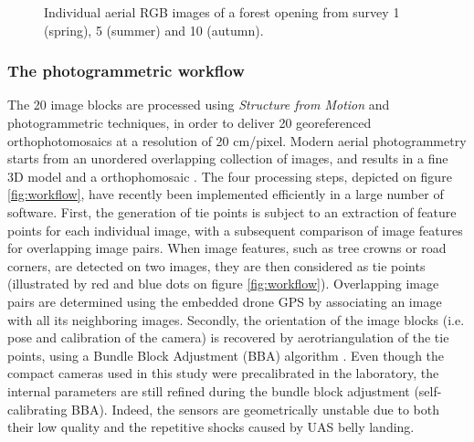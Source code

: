 \documentclass[remotesensing,article,submit,moreauthors,pdftex,12pt,a4paper]{mdpi} %
\begin{document}
\begin{figure}
\captionsetup[subfigure]{labelformat=empty}
\centering
{}\hspace{0.01mm}
\hspace{0.01mm}
\hspace{0.01mm}
\caption{Individual aerial RGB images of a forest opening from survey 1 (spring), 5 (summer) and 10 (autumn).}
\label{fig:TS_RawIm}
\end{figure}

\subsubsection{The photogrammetric workflow}

The 20 image blocks are processed using \textit{Structure from Motion} and photogrammetric techniques, in order to deliver 20 georeferenced orthophotomosaics at a resolution of 20 cm/pixel. 
Modern aerial photogrammetry starts from an unordered overlapping collection of images, and results in a fine 3D model and a orthophomosaic \citep{dandois_high_2013}. 
The four processing steps, depicted on figure \ref{fig:workflow}, have recently been implemented efficiently in a large number of software. 
First, the generation of tie points is subject to an extraction of feature points for each individual image, with a subsequent comparison of image features for overlapping image pairs. 
When image features, such as tree crowns or road corners, are detected on two images, they are then considered as tie points (illustrated by red and blue dots on figure \ref{fig:workflow}). 
Overlapping image pairs are determined using the embedded drone GPS by associating an image with all its neighboring images. 
Secondly, the orientation of the image blocks (i.e. pose and calibration of the camera) is recovered by aerotriangulation of the tie points, using a Bundle Block Adjustment (BBA) algorithm \cite{triggs_bundle_2000}. 
Even though the compact cameras used in this study were precalibrated in the laboratory, the internal parameters are still refined during the bundle block adjustment (self-calibrating BBA). 
Indeed, the sensors are geometrically unstable due to both their low quality \cite{labe_geometric_2004} and the repetitive shocks caused by UAS belly landing.
\end{document}
